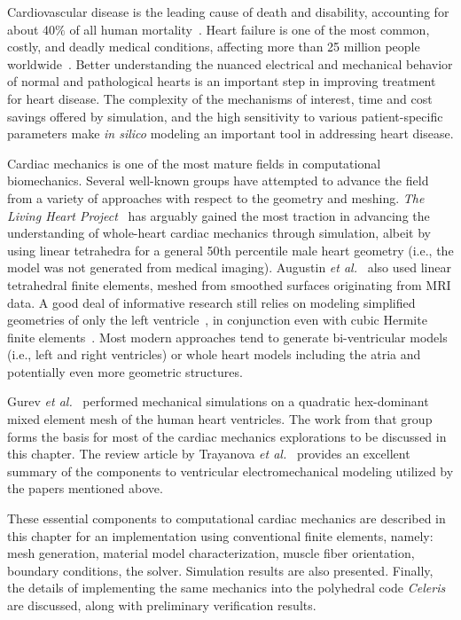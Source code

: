 Cardiovascular disease is the leading cause of death and disability, accounting for about 40$\%$ of all human mortality~\cite{genet_2015}. Heart failure is one of the most common, costly, and deadly medical conditions, affecting more than 25 million people worldwide~\cite{mann_2015}. Better understanding the nuanced electrical and mechanical behavior of normal and pathological hearts is an important step in improving treatment for heart disease. The complexity of the mechanisms of interest, time and cost savings offered by simulation, and the high sensitivity to various patient-specific parameters make \textit{in silico} modeling an important tool in addressing heart disease.

Cardiac mechanics is one of the most mature fields in computational biomechanics. Several well-known groups have attempted to advance the field from a variety of approaches with respect to the geometry and meshing. \textit{The Living Heart Project}~\cite{baillargeon_2014, genet_2015} has arguably gained the most traction in advancing the understanding of whole-heart cardiac mechanics through simulation, albeit by using linear tetrahedra for a general 50th percentile male heart geometry (i.e., the model was not generated from medical imaging). Augustin \textit{et al.}~\cite{augustin_2016} also used linear tetrahedral finite elements, meshed from smoothed surfaces originating from MRI data. A good deal of informative research still relies on modeling simplified geometries of only the left ventricle~\cite{guccione_2005, sack_2016}, in conjunction even with cubic Hermite finite elements~\cite{mcculloch_2000}. Most modern approaches tend to generate bi-ventricular models (i.e., left and right ventricles) or whole heart models including the atria and potentially even more geometric structures.

Gurev \textit{et al.}~\cite{gurev_2015} performed mechanical simulations on a quadratic hex-dominant mixed element mesh of the human heart ventricles. The work from that group forms the basis for most of the cardiac mechanics explorations to be discussed in this chapter. The review article by Trayanova \textit{et al.}~\cite{trayanova_2011} provides an excellent summary of the components to ventricular electromechanical modeling utilized by the papers mentioned above.

These essential components to computational cardiac mechanics are described in this chapter for an implementation using conventional finite elements, namely: mesh generation, material model characterization, muscle fiber orientation, boundary conditions, the solver. Simulation results are also presented. Finally, the details of implementing the same mechanics into the polyhedral code \textit{Celeris} are discussed, along with preliminary verification results.

